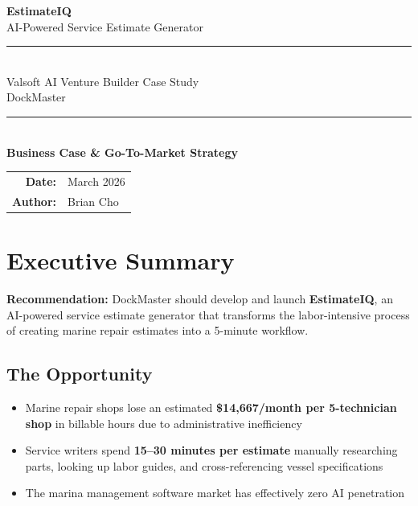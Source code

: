 \documentclass[11pt,a4paper]{article}
\newcommand{\highlight}[1]{\textbf{\textcolor{valsoftblue}{#1}}}
\begin{document}
\begin{titlepage}
    \centering
    \vspace*{1cm}
    
    {\Huge\bfseries\color{valsoftblue} EstimateIQ}\\[0.5cm]
    {\LARGE AI-Powered Service Estimate Generator}\\[2cm]
    
    \rule{\textwidth}{1.5pt}\\[0.5cm]
    {\Large Valsoft AI Venture Builder Case Study}\\[0.3cm]
    {\Large DockMaster}\\[0.5cm]
    \rule{\textwidth}{1.5pt}\\[2cm]
    
    {\large\bfseries Business Case \& Go-To-Market Strategy}\\[3cm]
    
    \vfill
    
    \begin{tabular}{rl}
        \textbf{Date:} & March 2026 \\[0.3cm]
        \textbf{Author:} & Brian Cho \\
    \end{tabular}
    
    
\end{titlepage}

\newpage
\tableofcontents
\newpage

\section{Executive Summary}

\textbf{Recommendation:} DockMaster should develop and launch \highlight{EstimateIQ}, an AI-powered service estimate generator that transforms the labor-intensive process of creating marine repair estimates into a 5-minute workflow.

\subsection*{The Opportunity}
\begin{itemize}[leftmargin=*]
    \item Marine repair shops lose an estimated \textbf{\$14,667/month per 5-technician shop} in billable hours due to administrative inefficiency
    \item Service writers spend \textbf{15--30 minutes per estimate} manually researching parts, looking up labor guides, and cross-referencing vessel specifications
    \item The marina management software market has effectively zero AI penetration
\end{itemize}
\end{document}
